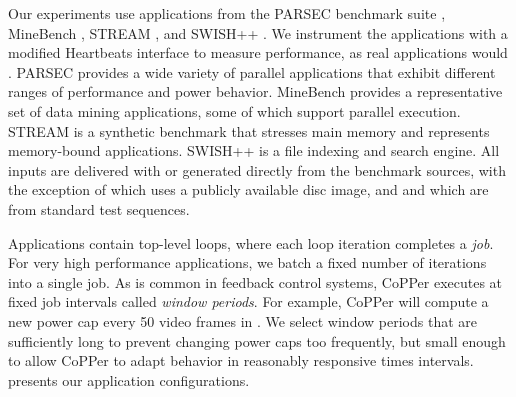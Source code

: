 Our experiments use applications from the PARSEC benchmark suite \cite{parsec}, MineBench \cite{minebench}, STREAM \cite{stream}, and SWISH++ \cite{swish}.
We instrument the applications with a modified Heartbeats interface to measure performance, as real applications would \cite{icac2010heartbeats}.
PARSEC provides a wide variety of parallel applications that exhibit different ranges of performance and power behavior.
MineBench provides a representative set of data mining applications, some of which support parallel execution.
STREAM is a synthetic benchmark that stresses main memory and represents memory-bound applications.
SWISH++ is a file indexing and search engine.
All inputs are delivered with or generated directly from the benchmark sources, with the exception of  which uses a publicly available disc image, and  and  which are from standard test sequences.

Applications contain top-level loops, where each loop iteration completes a \emph{job}.
For very high performance applications, we batch a fixed number of iterations into a single job.
As is common in feedback control systems, CoPPer executes at fixed job intervals called \emph{window periods}.
For example, CoPPer will compute a new power cap every 50 video frames in .
We select window periods that are sufficiently long to prevent changing power caps too frequently, but small enough to allow CoPPer to adapt behavior in reasonably responsive times intervals.
 presents our application configurations.


